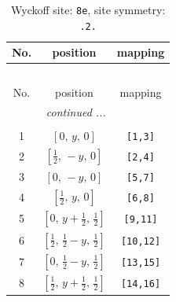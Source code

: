 \documentclass[fleqn,8pt]{jsarticle}
\begin{document}
\renewcommand{\arraystretch}{1.2}
\begin{longtable}{ccc}
\caption{Wyckoff site: {\tt 8e}, site symmetry: {\tt .2.}}
 \\
 \hline \hline
No. & position & mapping \\ \hline \endfirsthead

\multicolumn{2}{l}{\tablename\ \thetable{}} \\
 \hline \hline
No. & position & mapping \\ \hline \endhead

 \hline \hline
\multicolumn{2}{r}{\footnotesize\it continued ...} \\ \endfoot

 \hline \hline
\multicolumn{2}{r}{} \\ \endlastfoot

1 & $\left[ 0,\, y,\, 0 \right]$ & {\tt [1,3]} \\ \hline
2 & $\left[ \frac{1}{2},\, - y,\, 0 \right]$ & {\tt [2,4]} \\ \hline
3 & $\left[ 0,\, - y,\, 0 \right]$ & {\tt [5,7]} \\ \hline
4 & $\left[ \frac{1}{2},\, y,\, 0 \right]$ & {\tt [6,8]} \\ \hline
5 & $\left[ 0,\, y + \frac{1}{2},\, \frac{1}{2} \right]$ & {\tt [9,11]} \\ \hline
6 & $\left[ \frac{1}{2},\, \frac{1}{2} - y,\, \frac{1}{2} \right]$ & {\tt [10,12]} \\ \hline
7 & $\left[ 0,\, \frac{1}{2} - y,\, \frac{1}{2} \right]$ & {\tt [13,15]} \\ \hline
8 & $\left[ \frac{1}{2},\, y + \frac{1}{2},\, \frac{1}{2} \right]$ & {\tt [14,16]} \\
\end{longtable}
\renewcommand{\arraystretch}{1.2}
\end{document}
